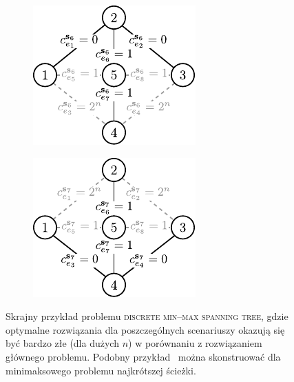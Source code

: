 \begin{figure}[!htbp]
	\null\hfill
	\begin{subfigure}[b]{0.3\textwidth}
		\includegraphics[width=\textwidth]{Chapter_II/MIN-MAX-DESC3-example/a}
		\caption{}
		\label{fig:minmaxexample2:a}
	\end{subfigure}
	\hfill
	\begin{subfigure}[b]{0.3\textwidth}
		\includegraphics[width=\textwidth]{Chapter_II/MIN-MAX-DESC3-example/b}
		\caption{}
		\label{fig:minmaxexample2:b}
	\end{subfigure}
	\hfill\null
	\caption{
		Skrajny przykład problemu \textsc{discrete min--max spanning tree}, gdzie optymalne rozwiązania dla poszczególnych scenariuszy okazują się być bardzo złe (dla dużych $n$) w porównaniu z rozwiązaniem głównego problemu. Podobny przykład~\cite[$429$--$430$]{minmaxSurvey} można skonstruować dla minimaksowego problemu najkrótszej ścieżki.
	}
	\label{fig:minmaxexample2}
\end{figure}

